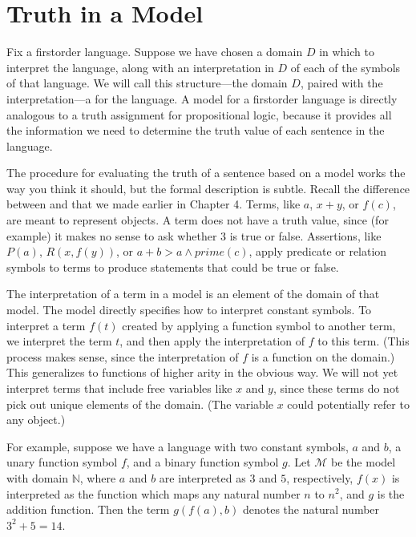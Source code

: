 \documentclass[letterpaper,10pt,english]{sphinxmanual}
\begin{document}
\section{Truth in a Model}
\label{\detokenize{semantics_of_first_order_logic:truth-in-a-model}}
\sphinxAtStartPar
Fix a first\sphinxhyphen{}order language. Suppose we have chosen a domain \(D\) in which to interpret the language, along with an interpretation in \(D\) of each of the symbols of that language. We will call this structure—the domain \(D\), paired with the interpretation—a  for the language. A model for a first\sphinxhyphen{}order language is directly analogous to a truth assignment for propositional logic, because it provides all the information we need to determine the truth value of each sentence in the language.

\sphinxAtStartPar
The procedure for evaluating the truth of a sentence based on a model works the way you think it should, but the formal description is subtle. Recall the difference between  and  that we made earlier in Chapter 4. Terms, like \(a\), \(x + y\), or \(f(c)\), are meant to represent objects. A term does not have a truth value, since (for example) it makes no sense to ask whether 3 is true or false. Assertions, like \(P(a)\), \(R(x, f(y))\), or \(a + b > a \wedge \mathit{prime}(c)\), apply predicate or relation symbols to terms to produce statements that could be true or false.

\sphinxAtStartPar
The interpretation of a term in a model is an element of the domain of that model. The model directly specifies how to interpret constant symbols. To interpret a term \(f(t)\) created by applying a function symbol to another term, we interpret the term \(t\), and then apply the interpretation of \(f\) to this term. (This process makes sense, since the interpretation of \(f\) is a function on the domain.) This generalizes to functions of higher arity in the obvious way. We will not yet interpret terms that include free variables like \(x\) and \(y\), since these terms do not pick out unique elements of the domain. (The variable \(x\) could potentially refer to any object.)

\sphinxAtStartPar
For example, suppose we have a language with two constant symbols, \(a\) and \(b\), a unary function symbol \(f\), and a binary function symbol \(g\). Let \({\mathcal M}\) be the model with domain \({\mathbb N}\), where \(a\) and \(b\) are interpreted as \(3\) and \(5\), respectively, \(f(x)\) is interpreted as the function which maps any natural number \(n\) to \(n^2\), and \(g\) is the addition function. Then the term \(g(f(a),b)\) denotes the natural number \(3^2+5 = 14\).
\end{document}
